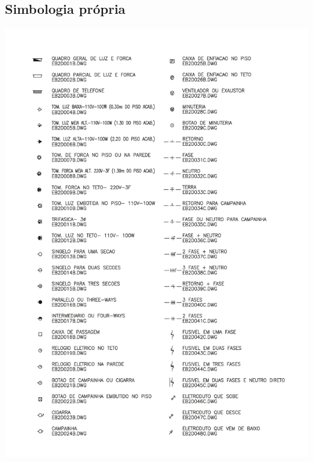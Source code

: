 \subsection{Simbologia própria}\label{subsection: simbologia propria}
{	\centering
	\includegraphics[width=\textwidth]{Figures/5. Symbology/simbologia2a.pdf}
	\label{fig: symbology 2a}
}
	
